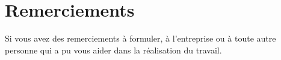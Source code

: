 \newpage

\section*{Remerciements}

Si vous avez des remerciements à formuler, à l’entreprise ou à toute autre personne qui a pu vous aider dans la réalisation du travail.



